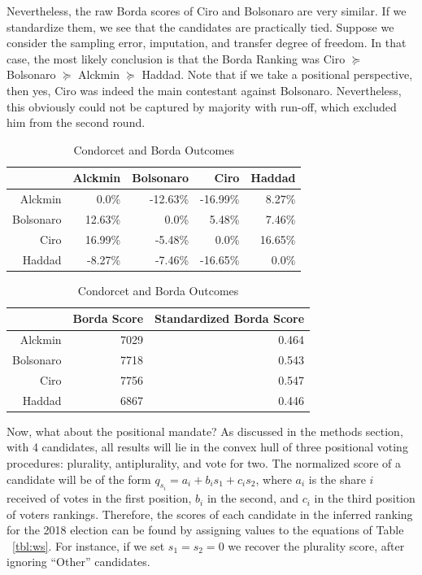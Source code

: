 \documentclass[hidelinks,11pt]{article} \usepackage[utf8]{inputenc}
\begin{document}
Nevertheless, the raw Borda scores of Ciro and Bolsonaro are very similar. If we standardize them, we see that the candidates are practically tied. Suppose we consider the sampling error, imputation, and transfer degree of freedom. In that case, the most likely conclusion is that the Borda Ranking was Ciro \(\succeq\) Bolsonaro \(\succeq\) Alckmin \(\succeq\) Haddad. Note that if we take a positional perspective, then yes, Ciro was indeed the main contestant against Bolsonaro. Nevertheless, this obviously could not be captured by  majority with run-off, which excluded him from the second round.

\begin{table}[!h]
  \begin{adjustwidth}{3cm}{}
\begin{subtable}[t]{0.48\textwidth} \centering
          \begin{tabular}{rrrrr} & Alckmin & Bolsonaro & Ciro & Haddad \\\hline
Alckmin & 0.0\% & -12.63\% & -16.99\% & 8.27\% \\ Bolsonaro & 12.63\% & 0.0\% &
5.48\% & 7.46\% \\ Ciro & 16.99\% & -5.48\% & 0.0\% & 16.65\% \\ Haddad &
-8.27\% & -7.46\% & -16.65\% & 0.0\% \\\hline
          \end{tabular}
    \caption{Pairwise Margins}
     \label{tbl:margins}
   \end{subtable} \vspace*{0.3cm}

\begin{subtable}[t]{0.48\textwidth} \centering
\begin{tabular}{rrr} \hline & Borda Score & Standardized Borda Score\\ \hline
Alckmin & 7029 & 0.464 \\ Bolsonaro & 7718 & 0.543 \\ Ciro & 7756 & 0.547\\
Haddad & 6867 & 0.446 \\ \hline
\end{tabular}
\caption{Borda Count Outcome}
\label{tbl:Borda}
\end{subtable}
\end{adjustwidth}
\caption{Condorcet and Borda Outcomes}
\label{tbl:overallresult}
\end{table}

Now, what about the positional mandate? As discussed in the methods section, with 4 candidates, all results will lie in the convex hull of three positional voting procedures: plurality, antiplurality, and vote for two. The normalized score of a candidate will be of the form \(q_{s_{i}} = a_{i} + b_{i}s_{1} + c_{i}s_{2}\), where \(a_{i}\) is the share \(i\) received of votes in the first position, \(b_{i}\) in the second, and \(c_{i}\) in the third position of voters rankings. Therefore, the scores of each candidate in the inferred ranking for the 2018 election can be found by assigning values to the equations of Table ~\ref{tbl:ws}. For instance, if we set \(s_{1} = s_{2} = 0\) we recover the plurality score, after ignoring ``Other'' candidates.

\end{document}
